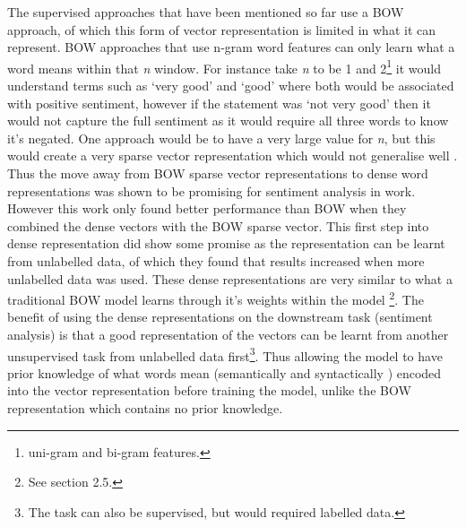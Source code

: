 The supervised approaches that have been mentioned so far use a BOW approach, of which this form of vector representation is limited in what it can represent. BOW approaches that use n-gram word features can only learn what a word means within that \textit{n} window. For instance take \textit{n} to be 1 and 2\footnote{uni-gram and bi-gram features.} it would understand terms such as `very good' and `good' where both would be associated with positive sentiment, however if the statement was `not very good' then it would not capture the full sentiment as it would require all three words to know it's negated. One approach would be to have a very large value for \textit{n}, but this would create a very sparse vector representation which would not generalise well \citep{le2014distributed}. Thus the move away from BOW sparse vector representations to dense word representations was shown to be promising for sentiment analysis in \citet{maas-etal-2011-learning} work. However this work only found better performance than BOW when they combined the dense vectors with the BOW sparse vector. This first step into dense representation did show some promise as the representation can be learnt from unlabelled data, of which they found that results increased when more unlabelled data was used. These dense representations are very similar to what a traditional BOW model learns through it's weights within the model \citep{goldberg2017neural}\footnote{See section 2.5.}. The benefit of using the dense representations on the downstream task (sentiment analysis) is that a good representation of the vectors can be learnt from another unsupervised task from unlabelled data first\footnote{The task can also be supervised, but would required labelled data.}. Thus allowing the model to have prior knowledge of what words mean (semantically and syntactically \citep{mikolov2013efficient}) encoded into the vector representation before training the model, unlike the BOW representation which contains no prior knowledge. 

